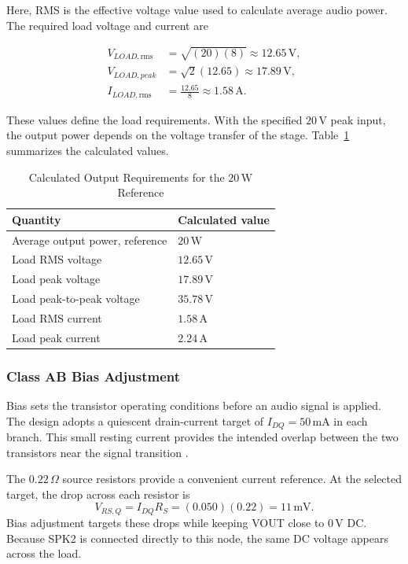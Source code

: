 \documentclass[conference,letterpaper]{IEEEtran}
\newcommand{\Ohm}{\Omega}
\newcommand{\V}{\mathrm{V}}
\newcommand{\A}{\mathrm{A}}
\newcommand{\W}{\mathrm{W}}
\begin{document}
Here, RMS is the effective voltage value used to calculate average
audio power. The required load voltage and current are

\begin{align}
V_{LOAD,\mathrm{rms}}&=\sqrt{(20)(8)}\approx12.65\,\V,\\
V_{LOAD,peak}&=\sqrt{2}(12.65)\approx17.89\,\V,\\
I_{LOAD,\mathrm{rms}}&=\frac{12.65}{8}\approx1.58\,\A.
\end{align}

These values define the load requirements. With the specified
$20\,\V$ peak input, the output power depends on the voltage transfer
of the stage. Table~\ref{tab:loadcalc} summarizes the calculated values.

\begin{table}[H]
\caption{Calculated Output Requirements for the $20\,\W$ Reference}
\label{tab:loadcalc}
\centering\footnotesize
\begin{tabular}{@{}p{}p{}@{}}
\toprule
Quantity & Calculated value\\
\midrule
Average output power, reference & $20\,\W$\\
Load RMS voltage & $12.65\,\V$\\
Load peak voltage & $17.89\,\V$\\
Load peak-to-peak voltage & $35.78\,\V$\\
Load RMS current & $1.58\,\A$\\
Load peak current & $2.24\,\A$\\
\bottomrule
\end{tabular}
\end{table}
\FloatBarrier

\subsubsection{Class AB Bias Adjustment}
Bias sets the transistor operating conditions before an audio signal
is applied. The design adopts a quiescent drain-current target of
$I_{DQ}=50\,\mathrm{mA}$ in each branch. This small resting current
provides the intended overlap between the two transistors near the
signal transition \cite[sec.~7--2]{floyd}.

The $0.22\,\Ohm$ source resistors provide a convenient current
reference. At the selected target, the drop across each resistor is
\begin{equation}
V_{RS,Q}=I_{DQ}R_S=(0.050)(0.22)=11\,\mathrm{mV}.
\label{eq:rsq}
\end{equation}
Bias adjustment targets these drops while keeping VOUT close to
$0\,\V$ DC. Because SPK2 is connected directly to this node,
the same DC voltage appears across the load.
\end{document}
